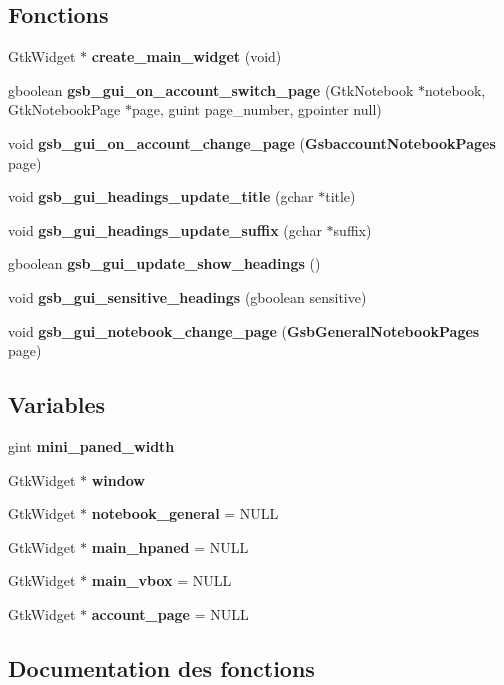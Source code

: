 \subsection*{Fonctions}
\begin{DoxyCompactItemize}
\item 
GtkWidget $\ast$ {\bf create\_\-main\_\-widget} (void)
\item 
gboolean {\bf gsb\_\-gui\_\-on\_\-account\_\-switch\_\-page} (GtkNotebook $\ast$notebook, GtkNotebookPage $\ast$page, guint page\_\-number, gpointer null)
\item 
void {\bf gsb\_\-gui\_\-on\_\-account\_\-change\_\-page} ({\bf GsbaccountNotebookPages} page)
\item 
void {\bf gsb\_\-gui\_\-headings\_\-update\_\-title} (gchar $\ast$title)
\item 
void {\bf gsb\_\-gui\_\-headings\_\-update\_\-suffix} (gchar $\ast$suffix)
\item 
gboolean {\bf gsb\_\-gui\_\-update\_\-show\_\-headings} ()
\item 
void {\bf gsb\_\-gui\_\-sensitive\_\-headings} (gboolean sensitive)
\item 
void {\bf gsb\_\-gui\_\-notebook\_\-change\_\-page} ({\bf GsbGeneralNotebookPages} page)
\end{DoxyCompactItemize}
\subsection*{Variables}
\begin{DoxyCompactItemize}
\item 
gint {\bf mini\_\-paned\_\-width}
\item 
GtkWidget $\ast$ {\bf window}
\item 
GtkWidget $\ast$ {\bf notebook\_\-general} = NULL
\item 
GtkWidget $\ast$ {\bf main\_\-hpaned} = NULL
\item 
GtkWidget $\ast$ {\bf main\_\-vbox} = NULL
\item 
GtkWidget $\ast$ {\bf account\_\-page} = NULL
\end{DoxyCompactItemize}


\subsection{Documentation des fonctions}
